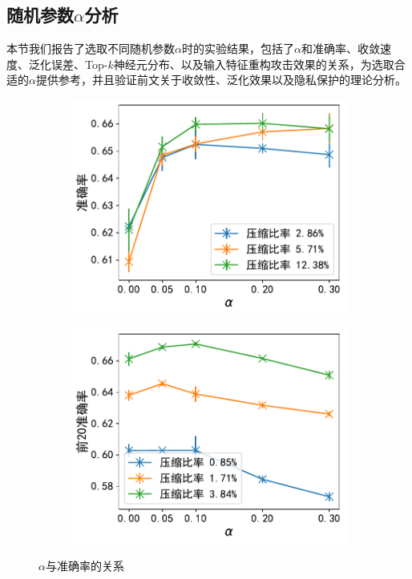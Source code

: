 \subsection{随机参数$\alpha$分析}
本节我们报告了选取不同随机参数$\alpha$时的实验结果，包括了$\alpha$和准确率、收敛速度、泛化误差、Top-$k$神经元分布、以及输入特征重构攻击效果的关系，为选取合适的$\alpha$提供参考，并且验证前文关于收敛性、泛化效果以及隐私保护的理论分析。


\begin{figure}[h!]
    \centering
    \begin{subfigure}{0.46\linewidth}
        \includegraphics[width=1\linewidth]{Z_Resources/随机topk_cifar-alpha.pdf}
        \label{fig:cifar-trainloss}
    \end{subfigure}
    \begin{subfigure}{0.46\linewidth}
        \includegraphics[width=1\linewidth]{Z_Resources/随机topk_yoochoose-alpha.pdf}
        \label{fig:cifar-generror}
    \end{subfigure}
    \caption{$\alpha$与准确率的关系}
    \label{fig:randomized_topk-alpha-acc}
\end{figure}

